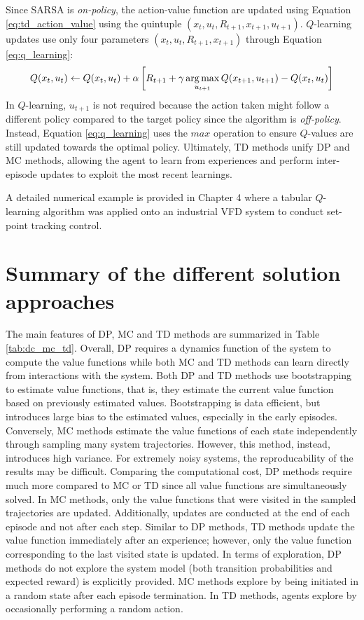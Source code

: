 Since SARSA is \textit{on-policy}, the action-value function are updated using Equation \ref{eq:td_action_value} using the quintuple $(x_t, u_t, R_{t+1}, x_{t+1}, u_{t+1})$. $Q$-learning updates use only four parameters $(x_t, u_t, R_{t+1}, x_{t+1})$ through Equation \ref{eq:q_learning}:
\begin{equation}
    Q(x_t, u_t) \leftarrow Q(x_t, u_t) + \alpha \left[R_{t+1} + \gamma \operatorname*{arg\,max}_{u_{t+1}} Q(x_{t+1}, u_{t+1}) - Q(x_t, u_t) \right]
    \label{eq:q_learning}
\end{equation}
In $Q$-learning, $u_{t+1}$ is not required because the action taken might follow a different policy compared to the target policy since the algorithm is \textit{off-policy}. Instead, Equation \ref{eq:q_learning} uses the $max$ operation to ensure $Q$-values are still updated towards the optimal policy. Ultimately, TD methods unify DP and MC methods, allowing the agent to learn from experiences and perform inter-episode updates to exploit the most recent learnings.

A detailed numerical example is provided in Chapter 4 where a tabular $Q$-learning algorithm was applied onto an industrial VFD system to conduct set-point tracking control.



\section{Summary of the different solution approaches}
The main features of DP, MC and TD methods are summarized in Table \ref{tab:dc_mc_td}. Overall, DP requires a dynamics function of the system to compute the value functions while both MC and TD methods can learn directly from interactions with the system. Both DP and TD methods use bootstrapping to estimate value functions, that is, they estimate the current value function based on previously estimated values. Bootstrapping is data efficient, but introduces large bias to the estimated values, especially in the early episodes.  Conversely, MC methods estimate the value functions of each state independently through sampling many system trajectories.  However, this method, instead, introduces high variance. For extremely noisy systems, the reproducability of the results may be difficult. Comparing the computational cost, DP methods require much more compared to MC or TD since all value functions are simultaneously solved. In MC methods, only the value functions that were visited in the sampled trajectories are updated.  Additionally, updates are conducted at the end of each episode and not after each step. Similar to DP methods, TD methods update the value function immediately after an experience; however, only the value function corresponding to the last visited state is updated. In terms of exploration, DP methods do not explore the system model (both transition probabilities and expected reward) is explicitly provided. MC methods explore by being initiated in a random state after each episode termination. In TD methods, agents explore by occasionally performing a random action.

